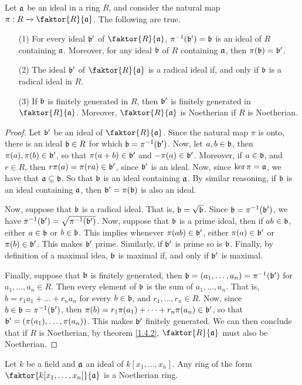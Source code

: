  \begin{theorem}\label{theorem_5.9.5}
     Let $\af$ be an ideal in a ring $R$, and consider the natural map $\pi:R
     \xrightarrow{} \faktor{R}{\af}$. The following are true.
     \begin{enumerate}
         \item[(1)] For every ideal $\bf'$ of $\faktor{R}{\af}$,
             $\inv{\pi}(\bf')=\bf$ is an ideal of $R$ containing $\af$.
             Moreover, for any ideal $\bf$ of $R$ containing $\af$, then
             $\pi(\bf)=\bf'$.

         \item[(2)] The ideal $\bf'$ of $\faktor{R}{\af}$ is a radical ideal if,
             and only if $\bf$ is a radical ideal in $R$.

         \item[(3)] If $\bf$ is finitely generated in $R$, then $\bf'$ is
             finitely generated in $\faktor{R}{\af}$. Moreover,
             $\faktor{R}{\af}$ is Noetherian if $R$ is Noetherian.
     \end{enumerate}
 \end{theorem}
 \begin{proof}
     Let $\bf'$ be an ideal of $\faktor{R}{\af}$. Since the natural map $\pi$ is
     onto, there is an ideal $\bf \in R$ for which $\bf=\inv{\pi}(\bf')$. Now,
     let $a,b \in \bf$, then $\pi(a),\pi(b) \in \bf'$, so that $\pi(a+b) \in
     \bf'$ and $-\pi(a) \in \bf'$. Moreover, if $a \in \bf$, and $r \in R$, then
     $r\pi(a)=\pi(ra) \in \bf'$, since $\bf'$ is an ideal. Now, since
     $\ker{\pi}=\af$, we have that $\af \subseteq \bf$. So that $\bf$ is an
     ideal containing $\af$. By similar reasoning, if $\bf$ is an ideal
     containing $\af$, then $\bf'=\pi(\bf)$ is also an ideal.

     Now, suppose that $\bf$ is a radical ideal. That is, $\bf=\sqrt{\bf}$. Since
     $\bf=\inv{\pi}(\bf')$, we have $\inv{\pi}(\bf')=\sqrt{\inv{\pi}(\bf')}$.
     Now, suppose that $\bf$ is a prime ideal, then if $ab \in \bf$, either $a
     \in \bf$ or $b \in \bf$. This implies whenever $\pi(ab) \in \bf'$, either
     $\pi(a) \in \bf'$ or $\pi(b) \in \bf'$. This makes $\bf'$ prime. Similarly,
     if $\bf'$ is prime so is $\bf$. Finally, by definition of a maximal idea,
     $\bf$ is maximal if, and only if $\bf'$ is maximal.

     Finally, suppose that $\bf$ is finitely generated, then $\bf=(a_1, \dots,
     a_n)=\inv{\pi}(\bf')$ for $a_1, \dots, a_n \in R$. Then every element of
     $\bf$ is the sum of $a_1, \dots, a_n$. That is, $b=r_1a_1+\dots+r_na_n$ for
     every $b \in \bf$, and $r_1, \dots, r_n \in R$. Now, since $b \in
     \bf=\inv{\pi}(\bf')$, then $\pi(b)=r_1\pi(a_1)+\dots+r_n\pi(a_n) \in \bf'$,
     so that $\bf'=(\pi(a_1), \dots, \pi(a_n))$. This makes $\bf'$ finitely
     generated. We can then conclude that if $R$ is Noetherian, by theorem
     \ref{1.4.2}, $\faktor{R}{\af}$ must also be Noetherian.
 \end{proof}
 \begin{corollary}
     Let $k$ be a field and $\af$ an ideal of $k[x_1, \dots, x_n]$. Any ring of
     the form $\faktor{k[x_1, \dots, x_n]}{\af}$ is a Noetherian ring.
 \end{corollary}
